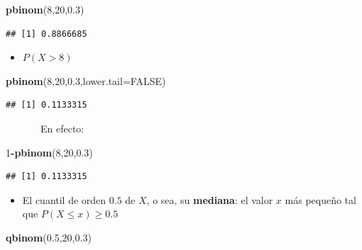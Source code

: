 \documentclass[]{book}
\newenvironment{Shaded}{\begin{snugshade}}{\end{snugshade}}
\newcommand{\DataTypeTok}[1]{\textcolor[rgb]{0.13,0.29,0.53}{#1}}
\newcommand{\DecValTok}[1]{\textcolor[rgb]{0.00,0.00,0.81}{#1}}
\newcommand{\FloatTok}[1]{\textcolor[rgb]{0.00,0.00,0.81}{#1}}
\newcommand{\KeywordTok}[1]{\textcolor[rgb]{0.13,0.29,0.53}{\textbf{#1}}}
\newcommand{\NormalTok}[1]{#1}
\newcommand{\OperatorTok}[1]{\textcolor[rgb]{0.81,0.36,0.00}{\textbf{#1}}}
\newcommand{\OtherTok}[1]{\textcolor[rgb]{0.56,0.35,0.01}{#1}}
\providecommand{\tightlist}{%
  \setlength{\itemsep}{0pt}\setlength{\parskip}{0pt}}
\theoremstyle{definition}
\theoremstyle{definition}
\theoremstyle{definition}
\theoremstyle{remark}
\begin{document}
\begin{Shaded}
\begin{Highlighting}[]
\KeywordTok{pbinom}\NormalTok{(}\DecValTok{8}\NormalTok{,}\DecValTok{20}\NormalTok{,}\FloatTok{0.3}\NormalTok{)  }
\end{Highlighting}
\end{Shaded}

\begin{verbatim}
## [1] 0.8866685
\end{verbatim}

\begin{itemize}
\tightlist
\item
  \(P(X>8)\)
\end{itemize}

\begin{Shaded}
\begin{Highlighting}[]
\KeywordTok{pbinom}\NormalTok{(}\DecValTok{8}\NormalTok{,}\DecValTok{20}\NormalTok{,}\FloatTok{0.3}\NormalTok{,}\DataTypeTok{lower.tail=}\OtherTok{FALSE}\NormalTok{)}
\end{Highlighting}
\end{Shaded}

\begin{verbatim}
## [1] 0.1133315
\end{verbatim}

~~~~~~~En efecto:

\begin{Shaded}
\begin{Highlighting}[]
\DecValTok{1}\OperatorTok{-}\KeywordTok{pbinom}\NormalTok{(}\DecValTok{8}\NormalTok{,}\DecValTok{20}\NormalTok{,}\FloatTok{0.3}\NormalTok{)}
\end{Highlighting}
\end{Shaded}

\begin{verbatim}
## [1] 0.1133315
\end{verbatim}

\begin{itemize}
\tightlist
\item
  El cuantil de orden \(0.5\) de \(X\), o sea, su \textbf{mediana}: el valor \(x\) más pequeño tal que \(P(X\leqslant x)\geqslant 0.5\)
\end{itemize}

\begin{Shaded}
\begin{Highlighting}[]
\KeywordTok{qbinom}\NormalTok{(}\FloatTok{0.5}\NormalTok{,}\DecValTok{20}\NormalTok{,}\FloatTok{0.3}\NormalTok{)  }
\end{Highlighting}
\end{Shaded}
\end{document}
